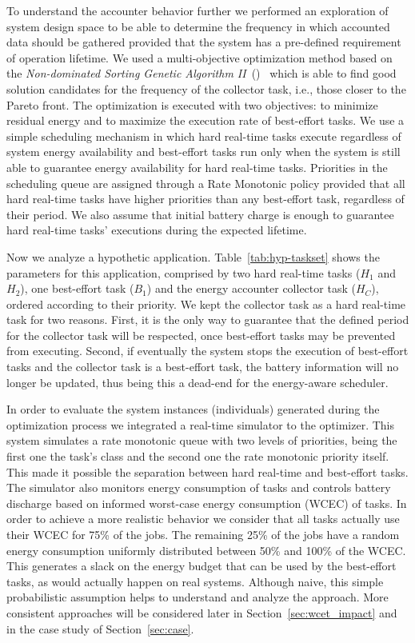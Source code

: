 To understand the accounter behavior further we performed an exploration of
system design space to be able to determine the frequency in which accounted
data should be gathered provided that the system has a pre-defined requirement
of operation lifetime. We used a multi-objective optimization method based on
the \textit{Non-dominated Sorting Genetic Algorithm II}~(\nsga)~\cite{Deb:2002}
which is able to find good solution candidates for the frequency of the
collector task, i.e., those closer to the Pareto front. The optimization is
executed with two objectives: to minimize residual energy and to maximize the
execution rate of best-effort tasks. We use a simple scheduling mechanism in
which hard real-time tasks execute regardless of system energy availability and
best-effort tasks run only when the system is still able to guarantee energy
availability for hard real-time tasks. Priorities in the scheduling queue are
assigned through a Rate Monotonic policy provided that all hard real-time tasks
have higher priorities than any best-effort task, regardless of their period. We
also assume that initial battery charge is enough to guarantee hard real-time
tasks' executions during the expected lifetime.


Now we analyze a hypothetic application. Table~\ref{tab:hyp-taskset} shows the
parameters for this application, comprised by two hard real-time tasks ($H_1$
and $H_2$), one best-effort task ($B_1$) and the energy accounter collector task
($H_C$), ordered according to their priority. We kept the collector task as a
hard real-time task for two reasons. First, it is the only way to guarantee that
the defined period for the collector task will be respected, once best-effort
tasks may be prevented from executing. Second, if eventually the system stops
the execution of best-effort tasks and the collector task is a best-effort task,
the battery information will no longer be updated, thus being this a dead-end
for the energy-aware scheduler.

In order to evaluate the system instances (individuals) generated during the
optimization process we integrated a real-time simulator to the optimizer. This
system simulates a rate monotonic queue with two levels of priorities, being the
first one the task's class and the second one the rate monotonic priority
itself. This made it possible the separation between hard real-time and
best-effort tasks. The simulator also monitors energy consumption of tasks and
controls battery discharge based on informed worst-case energy consumption
(WCEC) of tasks. In order to achieve a more realistic behavior we consider that
all tasks actually use their WCEC for 75\% of the jobs. The remaining 25\% of
the jobs have a random energy consumption uniformly distributed between 50\% and
100\% of the WCEC. This generates a slack on the energy budget that can be used
by the best-effort tasks, as would actually happen on real systems. Although
naive, this simple probabilistic assumption helps to understand and analyze the
approach. More consistent approaches will be considered later in
Section~\ref{sec:wcet_impact} and in the case study of Section~\ref{sec:case}.

